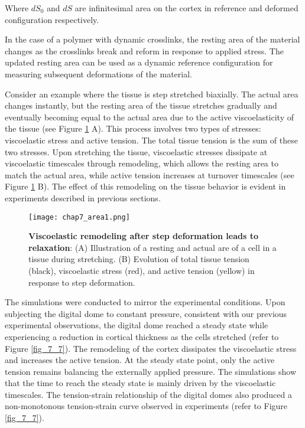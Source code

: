 Where $dS_{0}$ and $dS$ are infinitesimal area on the cortex in
reference and deformed configuration respectively.

In the case of a polymer with dynamic crosslinks, the resting area of the material changes as the crosslinks break and reform in response to applied stress. The updated resting area can be used as a dynamic reference configuration for measuring subsequent deformations of the material.

Consider an example where the tissue is step stretched biaxially. The actual area changes instantly, but the resting area of the tissue stretches gradually and eventually becoming equal to the actual area due to the active viscoelasticity of the tissue (see Figure \ref{fig_7_7a} A). This process involves two types of stresses: viscoelastic stress and active tension. The total tissue tension is the sum of these two stresses. Upon stretching the tissue, viscoelastic stresses dissipate at viscoelastic timescales through remodeling, which allows the resting area to match the actual area, while active tension increases at turnover timescales (see Figure \ref{fig_7_7a} B). The effect of this remodeling on the tissue behavior is evident in experiments described in previous sections.

\begin{figure}[b!]
	\centering
	\texttt{[image: chap7\_area1.png]}
	\caption{\label{fig_7_7a} \textbf{Viscoelastic remodeling after step deformation leads to relaxation}: (A) Illustration of a resting and actual are of a cell in a tissue during stretching. (B) Evolution of total tissue tension (black), viscoelastic stress (red), and active tension (yellow) in response to step deformation.
	}
\end{figure}

The simulations were conducted to mirror the experimental conditions. Upon subjecting the digital dome to constant pressure, consistent with our previous experimental observations, the digital dome reached a steady state while experiencing a reduction in cortical thickness as the cells stretched (refer to Figure \ref{fig_7_7}). The remodeling of the cortex dissipates the viscoelastic stress and increases the active tension. At the steady state point, only the active tension remains balancing the externally applied pressure. The simulations show that the time to reach the steady state is mainly driven by the viscoelastic timescales. The tension-strain relationship of the digital domes also produced a non-monotonous tension-strain curve observed in experiments (refer to Figure \ref{fig_7_7}).


